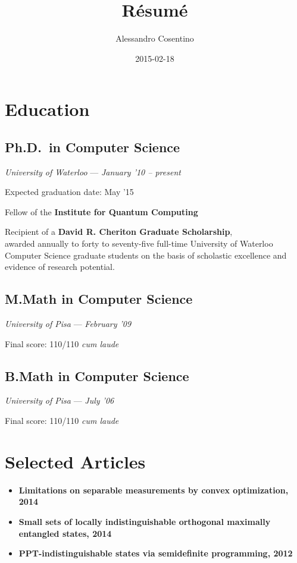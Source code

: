 \documentclass[]{article}
\title{Résumé}
\author{Alessandro Cosentino}
\date{2015-02-18}
\begin{document}
\maketitle

\section{Education}\label{education}

\subsection{Ph.D.~in Computer Science}\label{ph.d.in-computer-science}

\emph{University of Waterloo} --- \emph{January '10 -- present}

Expected graduation date: May '15

Fellow of the \textbf{Institute for Quantum Computing}

Recipient of a \textbf{David R. Cheriton Graduate Scholarship},\\awarded
annually to forty to seventy-five full-time University of Waterloo
Computer Science graduate students on the basis of scholastic excellence
and evidence of research potential.

\subsection{M.Math in Computer
Science}\label{m.math-in-computer-science}

\emph{University of Pisa} --- \emph{February '09}

Final score: 110/110 \emph{cum laude}

\subsection{B.Math in Computer
Science}\label{b.math-in-computer-science}

\emph{University of Pisa} --- \emph{July '06}

Final score: 110/110 \emph{cum laude}

\section{Selected Articles}\label{selected-articles}

\begin{itemize}
\itemsep1pt\parskip0pt
\item
  \textbf{Limitations on separable measurements by convex optimization,
  2014}
\item
  \textbf{Small sets of locally indistinguishable orthogonal maximally
  entangled states, 2014}
\item
  \textbf{PPT-indistinguishable states via semidefinite programming,
  2012}
\end{itemize}
\end{document}

